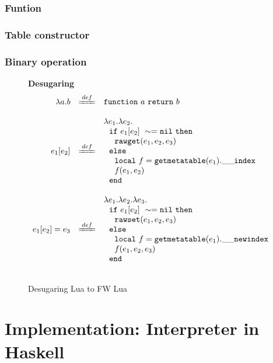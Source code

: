 \documentclass{article}
\begin{document}
\subsubsection{Funtion}
\subsubsection{Table constructor}
\subsubsection{Binary operation}


\newcommand{\desugar}[2]{{#1} & \xlongequal[]{def} & {\begin{array}{@{}l@{}} #2 \end{array}}\\}

\begin{figure}[P]
\caption{Desugaring Lua to FW Lua}
{\bf Desugaring}
\label{fig:FW2.1metamethods}
\[
\begin{array}{rclcl}

\desugar{
    \aFunction{a}{b}
}{
    {\tt function} ~a~ {\tt return} ~b~
}
\\
\desugar{
     e_1[e_2]
}{
    {\lambda}e_1.{\lambda}e_2.\\
    ~~{\tt if}~ e_1[e_2] ~\sim= {\tt nil} ~ {\tt then}\\
    ~~~~{\tt rawget}(e_1, e_2,e_3) ~\\
    ~~{\tt else}\\
    ~~~~{\tt local}~f = {\tt getmetatable}(e_1).{\tt{\_}{\_}index}~\\
    ~~~~f(e_1,e_2)\\ 
    ~~{\tt end}
}
\\
\desugar{
     e_1[e_2]=e_3
}{
    {\lambda}e_1.{\lambda}e_2.{\lambda}e_3.\\
    ~~{\tt if}~ e_1[e_2] ~\sim= {\tt nil} ~ {\tt then}\\
    ~~~~{\tt rawset}(e_1, e_2,e_3) ~\\
    ~~{\tt else}\\
    ~~~~{\tt local}~f = {\tt getmetatable}(e_1).{\tt{\_}{\_}newindex}~\\
    ~~~~f(e_1,e_2,e_3)\\ 
    ~~{\tt end}
}
\\


\end{array}
\]
\end{figure}
\section{Implementation: Interpreter in Haskell}
\end{document}
